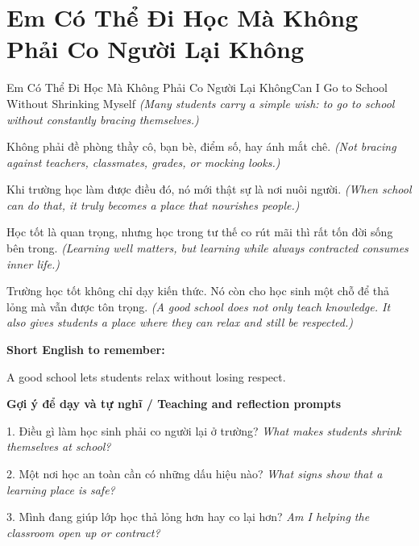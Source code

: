 \section{Em Có Thể Đi Học Mà Không Phải Co Người Lại Không}
\begin{truyen}{Em Có Thể Đi Học Mà Không Phải Co Người Lại Không}{Can I Go to School Without Shrinking Myself}
\textit{(Many students carry a simple wish: to go to school without constantly bracing themselves.)}

Không phải đề phòng thầy cô, bạn bè, điểm số, hay ánh mắt chê.
\textit{(Not bracing against teachers, classmates, grades, or mocking looks.)}

Khi trường học làm được điều đó, nó mới thật sự là nơi nuôi người.
\textit{(When school can do that, it truly becomes a place that nourishes people.)}

Học tốt là quan trọng, nhưng học trong tư thế co rút mãi thì rất tốn đời sống bên trong.
\textit{(Learning well matters, but learning while always contracted consumes inner life.)}

\end{truyen}

\begin{baihoc}
Trường học tốt không chỉ dạy kiến thức. Nó còn cho học sinh một chỗ để thả lỏng mà vẫn được tôn trọng.
\textit{(A good school does not only teach knowledge. It also gives students a place where they can relax and still be respected.)}
\end{baihoc}

\begin{ghinhoanh}
\textbf{Short English to remember:}

A good school lets students relax without losing respect.

\end{ghinhoanh}

\begin{tuhocnhanh}
\textbf{Gợi ý để dạy và tự nghĩ / Teaching and reflection prompts}

1. Điều gì làm học sinh phải co người lại ở trường? \textit{What makes students shrink themselves at school?}

2. Một nơi học an toàn cần có những dấu hiệu nào? \textit{What signs show that a learning place is safe?}

3. Mình đang giúp lớp học thả lỏng hơn hay co lại hơn? \textit{Am I helping the classroom open up or contract?}
\end{tuhocnhanh}
\ngancach

